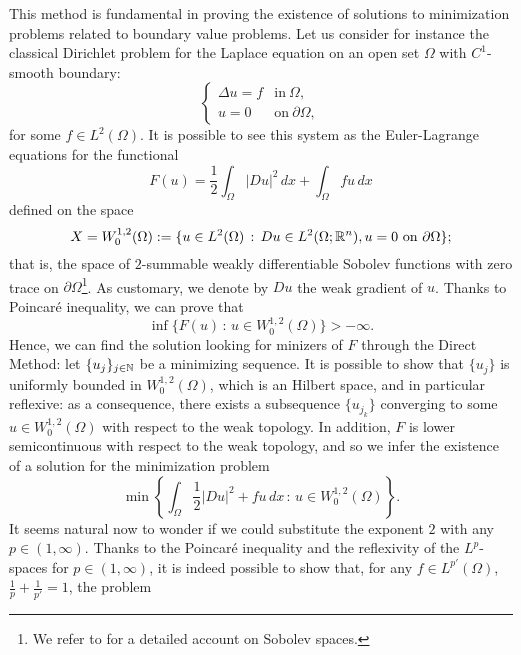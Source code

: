 This method is fundamental in proving the existence of solutions to minimization problems related to boundary value problems. Let us consider for instance the classical Dirichlet problem for the Laplace equation on an open set $\Omega$ with $C^{1}$-smooth boundary:
\begin{equation*}
\begin{cases} 
\Delta u = f & \text{in} \ \Omega, \\
u = 0 & \text{on} \ \partial \Omega,
\end{cases}
\end{equation*}
for some $f \in L^{2}(\Omega)$.
It is possible to see this system as the Euler-Lagrange equations for the functional
\begin{equation*}
F(u) = \frac{1}{2} \int_{\Omega} |D u|^{2} \, dx + \int_{\Omega} f u \, dx
\end{equation*}
defined on the space 
\begin{equation*}
X = W^{1, 2}_{0}(\Omega) := \{ u \in L^{2}(\Omega) \, : \,  Du \in L^{2}(\Omega; \mathbb{R}^{n}), u = 0 \ \text{on} \ \partial \Omega \};
\end{equation*}
that is, the space of $2$-summable weakly differentiable Sobolev functions with zero trace on $\partial \Omega$\footnote{We refer to \cite[Chapter 4]{evans2015measure} for a detailed account on Sobolev spaces.}. As customary, we denote by $Du$ the weak gradient of $u$.
Thanks to Poincar\'e inequality, we can prove that 
\begin{equation*}
\inf \{ F(u) \, :\, u \in W^{1, 2}_{0}(\Omega) \} > - \infty.
\end{equation*}
Hence, we can find the solution looking for minizers of $F$ through the Direct Method: let $\{u_{j}\}_{j \in \mathbb{N}}$ be a minimizing sequence. It is possible to show that $\{u_{j}\}$ is uniformly bounded in $W^{1, 2}_{0}(\Omega)$, which is an Hilbert space, and in particular reflexive: as a consequence, there exists a subsequence $\{u_{j_{k}}\}$ converging to some $u \in W^{1, 2}_{0}(\Omega)$ with respect to the weak topology. In addition, $F$ is lower semicontinuous with respect to the weak topology, and so we infer the existence of a solution for the minimization problem
\begin{equation*}
\min \left \{ \int_{\Omega} \frac{1}{2} |D u|^{2} + f u \, dx \, : \, u \in W^{1, 2}_{0}(\Omega) \right \}.
\end{equation*}
It seems natural now to wonder if we could substitute the exponent $2$ with any $p \in (1, \infty)$. Thanks to the Poincar\'e inequality and the reflexivity of the $L^{p}$-spaces for $p \in (1, \infty)$, it is indeed possible to show that, for any $f \in L^{p'}(\Omega)$, $\frac{1}{p} + \frac{1}{p'} = 1$, the problem
